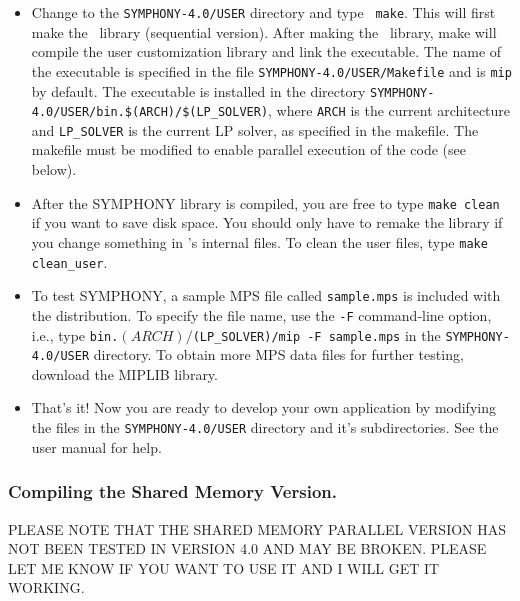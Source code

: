 \begin{itemize}
        \item Change to the \texttt{SYMPHONY-4.0/USER} directory and type
\texttt{ make}. This will first make the
\BB\ library (sequential version). After making the \BB\ library, make will
compile the user customization library and link the executable. The name of
the executable is specified in the file \texttt{SYMPHONY-4.0/USER/Makefile}
and is \texttt{mip} by default. The executable is installed in the directory
\texttt{SYMPHONY-4.0/USER/bin.\$(ARCH)/\$(LP\_SOLVER)}, where \texttt{ARCH} is 
the current architecture and \texttt{LP\_SOLVER} is the current LP solver, as 
specified in the makefile. The makefile must be modified to enable parallel 
execution of the code (see below).

\item After the SYMPHONY library is compiled, you are free to type {\tt make
        clean} if you want to save disk space. You should only have to
        remake the library if you change something in \BB's internal files. To
        clean the user files, type {\tt make clean\_user}.

\item To test SYMPHONY, a sample MPS file called \texttt{sample.mps} is included 
with the distribution. To specify the file name, use the \texttt{-F} command-line
option, i.e., type \texttt{bin.$(ARCH)/$(LP\_SOLVER)/mip -F sample.mps} in the
\texttt{SYMPHONY-4.0/USER} directory. To obtain more MPS data files for further
testing, download the MIPLIB library.

\item That's it! Now you are ready to develop your own application by modifying
the files in the \texttt{SYMPHONY-4.0/USER} directory and it's
subdirectories. See the user manual for help.

\end{itemize}

\subsubsection{Compiling the Shared Memory Version.}

PLEASE NOTE THAT THE SHARED MEMORY PARALLEL VERSION HAS NOT BEEN TESTED
IN VERSION 4.0 AND MAY BE BROKEN. PLEASE LET ME KNOW IF YOU WANT TO USE IT AND
I WILL GET IT WORKING.

